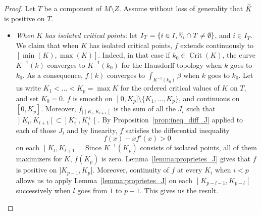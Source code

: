 \documentclass[AHL,Unicode,longabstracts]{cedram}
\DeclareMathOperator{\Crit}{Crit}
\let\oldtilde\tilde
\renewcommand*{\tilde}[1]{\mathchoice{\widetilde{#1}}{\widetilde{#1}}{\oldtilde{#1}}{\oldtilde{#1}}}
\begin{document}
\begin{proof}
Let $T$ be a component of $M \setminus Z$. Assume without loss of generality that $\tilde K$ is positive on $T$.
\begin{itemize}
\item
\emph{When $K$ has isolated critical points: } let $I_T = \{i \in I, \tilde \gamma_i \cap T \neq \emptyset\}$, and $i \in I_T$. We claim that when $K$ has isolated critical points, $f$ extends continuously to $[\min(K), \max(K)]$. Indeed, in that case if $k_0 \in \Crit(K)$, the curve $K^{-1}(k)$ converges to $K^{-1}(k_0)$ for the Hausdorff topology when $k$ goes to $k_0$. As a consequence, $f(k)$ converges to $\int_{K^{-1}(k_0)} \beta$ when $k$ goes to $k_0$. Let us write $K_1 < \dots < K_p = \max K$ for the ordered critical values of $K$ on $T$, and set $K_0 = 0$. $f$ is smooth on $\mathopen{]}0, K_p] \setminus \{K_1, \ldots, K_p\}$, and continuous on $[0, K_p]$. Moreover, $f_{|\mathopen{]}K_l, K_{l+1}\mathclose{[}}$ is the sum of all the $J_i$ such that $\mathopen{]}K_l, K_{l+1}[\subset]K_i^-, K_i^+\mathclose{[}$. By Proposition~\ref{prop:ineq_diff_J} applied to each of those $J_i$ and by linearity, $f$ satisfies the differential inequality
\[
f(x) - x f'(x) > 0
\]
on each $\mathopen{]}K_l, K_{l+1}\mathclose{[}$. Since $K^{-1}(K_p)$ consists of isolated points, all of them maximizers for $K$, $f(K_p)$ is zero. Lemma~\ref{lemma:proprietes_J} gives that $f$ is positive on $]K_{p-1}, K_p[$. Moreover, continuity of $f$ at every $K_i$ when $i < p$ allows us to apply Lemma~\ref{lemma:proprietes_J} on each $\mathopen{]}K_{p-l-1}, K_{p-l}\mathclose{[}$ successively when $l$ goes from $1$ to $p-1$. This gives us the result.


\end{itemize}
\end{proof}
\end{document}
